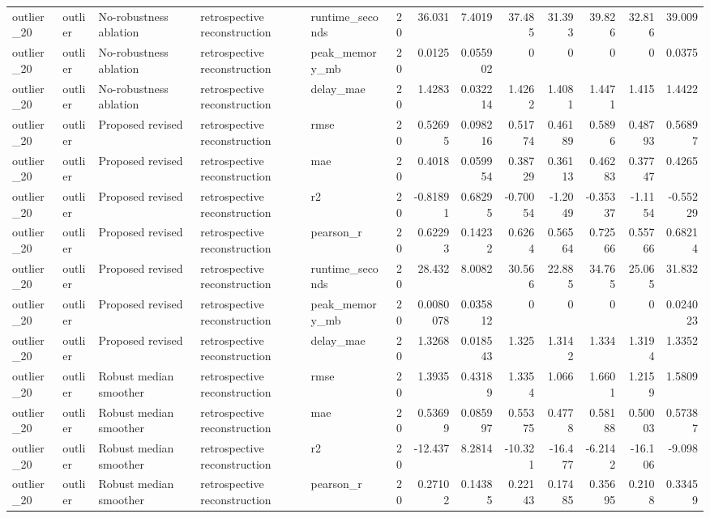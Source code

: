 \begin{table}[!htbp]
{{\begin{tabular}{lllllrrrrrrrr}
outlier_20 & outlier & No-robustness ablation & retrospective reconstruction & runtime_seconds & 20 & 36.031 & 7.4019 & 37.485 & 31.393 & 39.826 & 32.816 & 39.009 \\
outlier_20 & outlier & No-robustness ablation & retrospective reconstruction & peak_memory_mb & 20 & 0.0125 & 0.055902 & 0 & 0 & 0 & 0 & 0.0375 \\
outlier_20 & outlier & No-robustness ablation & retrospective reconstruction & delay_mae & 20 & 1.4283 & 0.032214 & 1.4262 & 1.4081 & 1.4471 & 1.415 & 1.4422 \\
outlier_20 & outlier & Proposed revised & retrospective reconstruction & rmse & 20 & 0.52695 & 0.098216 & 0.51774 & 0.46189 & 0.5896 & 0.48793 & 0.56897 \\
outlier_20 & outlier & Proposed revised & retrospective reconstruction & mae & 20 & 0.4018 & 0.059954 & 0.38729 & 0.36113 & 0.46283 & 0.37747 & 0.4265 \\
outlier_20 & outlier & Proposed revised & retrospective reconstruction & r2 & 20 & -0.81891 & 0.68295 & -0.70054 & -1.2049 & -0.35337 & -1.1154 & -0.55229 \\
outlier_20 & outlier & Proposed revised & retrospective reconstruction & pearson_r & 20 & 0.62293 & 0.14232 & 0.6264 & 0.56564 & 0.72566 & 0.55766 & 0.68214 \\
outlier_20 & outlier & Proposed revised & retrospective reconstruction & runtime_seconds & 20 & 28.432 & 8.0082 & 30.566 & 22.885 & 34.765 & 25.065 & 31.832 \\
outlier_20 & outlier & Proposed revised & retrospective reconstruction & peak_memory_mb & 20 & 0.0080078 & 0.035812 & 0 & 0 & 0 & 0 & 0.024023 \\
outlier_20 & outlier & Proposed revised & retrospective reconstruction & delay_mae & 20 & 1.3268 & 0.018543 & 1.325 & 1.3142 & 1.334 & 1.3194 & 1.3352 \\
outlier_20 & outlier & Robust median smoother & retrospective reconstruction & rmse & 20 & 1.3935 & 0.43189 & 1.3354 & 1.066 & 1.6601 & 1.2159 & 1.5809 \\
outlier_20 & outlier & Robust median smoother & retrospective reconstruction & mae & 20 & 0.53699 & 0.085997 & 0.55375 & 0.4778 & 0.58188 & 0.50003 & 0.57387 \\
outlier_20 & outlier & Robust median smoother & retrospective reconstruction & r2 & 20 & -12.437 & 8.2814 & -10.321 & -16.477 & -6.2142 & -16.106 & -9.098 \\
outlier_20 & outlier & Robust median smoother & retrospective reconstruction & pearson_r & 20 & 0.27102 & 0.14385 & 0.22143 & 0.17485 & 0.35695 & 0.2108 & 0.33459 \\

\end{tabular}}}
\end{table}

